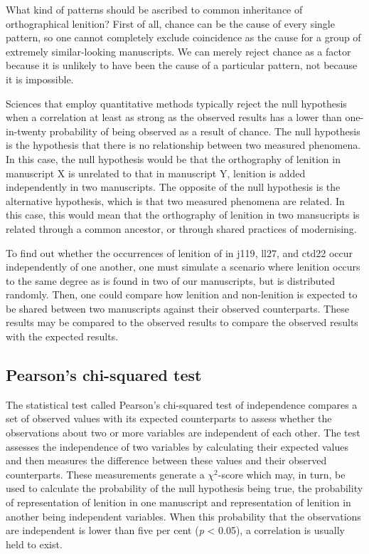 What kind of patterns should be ascribed to common inheritance of orthographical lenition? First of all, chance can be the cause of every single pattern, so one cannot completely exclude coincidence as the cause for a group of extremely similar-looking manuscripts. We can merely reject chance as a factor because it is unlikely to have been the cause of a particular pattern, not because it is impossible.

Sciences that employ quantitative methods typically reject the null hypothesis when a correlation at least as strong as the observed results has a lower than one-in-twenty probability of being observed as a result of chance.  The null hypothesis is the hypothesis that there is no relationship between two measured phenomena. In this case,  the null hypothesis would be that the orthography of lenition in manuscript X is unrelated to that in manuscript Y, \ie lenition is added independently in two manuscripts. The opposite of the null hypothesis is the alternative hypothesis, which is  that two measured phenomena are related. In this case, this would mean that the orthography of lenition in two mansucripts is related through a common ancestor, or through shared practices of modernising.


To find out whether the occurrences of lenition of  in \gls{j119}, \gls{ll27}, and \gls{ctd22} occur independently of one another, one must simulate a scenario where lenition occurs to the same degree as is found in two of our manuscripts, but is distributed randomly. Then, one could compare how lenition and non-lenition is expected to be shared between two manuscripts against their observed counterparts. These results may  be compared to the observed results to compare the observed results with the expected results.

\subsection{Pearson's chi-squared test }
\label{sec:pearsons-chi-squared}

The statistical test called Pearson's chi-squared test of independence compares a set of observed values with its expected counterparts to assess whether the  observations about two or more variables are independent of each other.
The test assesses the independence of two variables by calculating their expected values and then measures the difference between these values and their observed counterparts. These measurements generate a \(\chi^2\)-score which may, in turn, be used to calculate the probability of the null hypothesis being true, \ie the probability of  representation of lenition in one manuscript and representation of lenition in another being independent variables. When this probability that the observations are independent is lower than five per cent (\emph{p} < 0.05), a correlation is usually held to exist.

